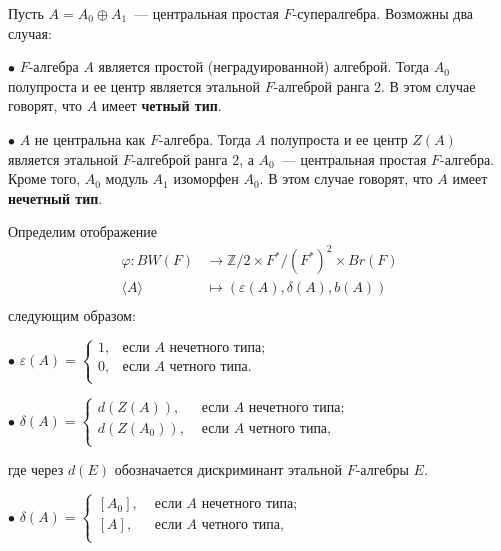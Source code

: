 \documentclass[a4paper,oneside,12pt]{article}
\theoremstyle{plain} { \swapnumbers
\newtheorem{theorem}{Теорема}[subsection]
\newtheorem{corollary}[theorem]{Следствие}
\newtheorem{lemma}[theorem]{Лемма}
\newtheorem{proposition}[theorem]{Утверждение}
\newtheorem{claim}[theorem]{Факт}
}
\theoremstyle{definition} { \swapnumbers
\newtheorem{definition}[theorem]{Определение}
\newtheorem{notation}[theorem]{Обозначение}
\newtheorem{remark}[theorem]{Замечание}
\newtheorem{remarks}[theorem]{Замечания}
\newtheorem{example}[theorem]{Пример}
\newtheorem{examples}[theorem]{Примеры}
\newtheorem{sssection}[theorem]{}
}
\def\ph{\varphi}
\def\la{\langle}
\def\ra{\rangle}
\begin{document}
Пусть $A=A_0\oplus A_1$~--- центральная простая $F$-супералгебра. Возможны два случая:
\par\noindent$\bullet$ $F$-алгебра $A$ является простой (неградуированной) алгеброй.
Тогда $A_0$ полупроста и ее центр является этальной $F$-алгеброй ранга 2.
В этом случае говорят, что $A$ имеет {\bf четный тип}.
\par\noindent$\bullet$ $A$ не центральна как $F$-алгебра. Тогда $A$ полупроста и ее
центр $Z(A)$ является этальной $F$-алгеброй ранга 2, а $A_0$~--- центральная простая
$F$-алгебра. Кроме того, $A_0$ модуль $A_1$ изоморфен $A_0$. В этом случае говорят,
что $A$ имеет {\bf нечетный тип}.

Определим отображение
$$
\begin{aligned}
\ph\colon BW(F)&\to\mathbb Z/2\times F^*/(F^*)^2\times Br(F)\\
\la A\ra&\mapsto (\varepsilon(A),\delta(A),b(A))\\
\end{aligned}
$$
следующим образом:
\par\noindent$\bullet$ $\varepsilon(A)=\begin{cases}
1,&\text{если $A$ нечетного типа};\\
0,&\text{если $A$ четного типа}.\\
\end{cases}$
\par\noindent$\bullet$ $\delta(A)=\begin{cases}
d(Z(A)),&\text{ если $A$ нечетного типа};\\
d(Z(A_0)),&\text{ если $A$ четного типа},\\
\end{cases}$
\par\noindent
где через $d(E)$ обозначается дискриминант этальной $F$-алгебры $E$.
\par\noindent$\bullet$ $\delta(A)=\begin{cases}
[A_0],&\text{ если $A$ нечетного типа};\\
[A],&\text{ если $A$ четного типа},\\
\end{cases}$
\end{document}
